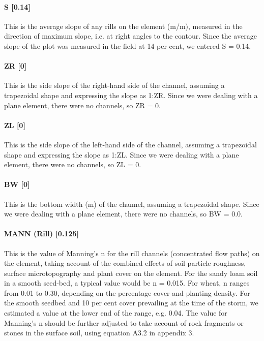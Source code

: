 \paragraph{S [0.14]}
This is the average slope of any rills on the element (m/m), measured in the direction of maximum slope, i.e. at right angles to the contour. Since the average slope of the plot was measured in the field at 14 per cent, we entered S = 0.14.
 
\paragraph{ZR [0]}
This is the side slope of the right-hand side of the channel, assuming a trapezoidal shape and expressing the slope as 1:ZR. Since we were dealing with a plane element, there were no channels, so ZR = 0.
 
\paragraph{ZL [0]}
This is the side slope of the left-hand side of the channel, assuming a trapezoidal shape and expressing the slope as 1:ZL. Since we were dealing with a plane element, there were no channels, so ZL = 0.
 
\paragraph{BW [0]}
This is the bottom width (m) of the channel, assuming a trapezoidal shape. Since we were dealing with a plane element, there were no channels, so BW = 0.0.
 
\paragraph{MANN (Rill) [0.125]}
This is the value of Manning's n for the rill channels (concentrated flow paths) on the element, taking account of the combined effects of soil particle roughness, surface microtopography and plant cover on the element. For the sandy loam soil in a smooth seed-bed, a typical value would be n = 0.015. For wheat, n ranges from 0.01 to 0.30, depending on the percentage cover and planting density. For the smooth seedbed and 10 per cent cover prevailing at the time of the storm, we estimated a value at the lower end of the range, e.g. 0.04.
The value for Manning's n should be further adjusted to take account of rock fragments or stones in the surface soil, using equation A3.2 in appendix 3.
 
